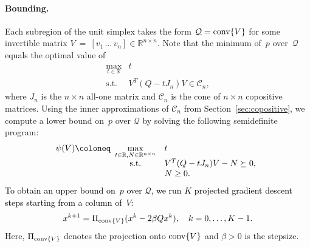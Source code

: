 \documentclass[12pt]{article}
\newcommand{\reals}{\mathbb{R}}
\newcommand{\defeq}{\coloneq}
\newcommand{\st}{\text{s.t.}}
\newcommand{\conv}{\operatornamewithlimits{conv}}
\newcommand{\mcQ}{\mathcal{Q}}
\newcommand{\mcC}{\mathcal{C}}
\theoremstyle{remark}
\begin{document}
\paragraph{Bounding.}
Each subregion of the unit simplex takes the form $\mcQ = \conv\{V\}$ for some invertible
matrix $V~=~[v_1 \,\ldots\, v_n]\in\reals^{n \times n}$. Note that the minimum of~$p$ over~$\mcQ$ equals the optimal value of
\begin{equation*}
    \begin{array}{cl}
        \max\limits_{t\in\reals} & t\\
        \st & V^T(Q-tJ_n)V\in\mcC_n,
    \end{array}
\end{equation*}
where $J_n$ is the $n\times n$ all-one matrix and $\mcC_n$ is the cone of $n\times n$ copositive matrices. Using the inner approximations of $\mcC_n$ from Section~\ref{sec:copositive}, we compute a lower bound on~$p$ over $\mcQ$ by solving the following semidefinite program:
\begin{equation}\label{eq:DiSOS_lb_mat}
    \psi(V)\defeq \begin{array}[t]{cl}
        \max\limits_{t\in\reals,N\in\reals^{n\times n}} & t\\
        \st & V^T(Q-tJ_n)V-N\succeq 0,\\
            & N\ge 0.
    \end{array}
\end{equation}
\textcolor{black}{To obtain an upper bound on~$p$ over $\mcQ$, we run $K$ projected gradient descent steps starting from a column of~$V$:}
\begin{equation}\label{eq:pgd_copos}
    x^{k+1} = \Pi_{\conv\{V\}}(x^k - 2\beta Qx^k),\quad k=0,\ldots,K-1.
\end{equation}
Here, $\Pi_{\conv\{V\}}$ denotes the projection onto $\conv\{V\}$ 
and $\beta>0$ is the stepsize.
\end{document}
